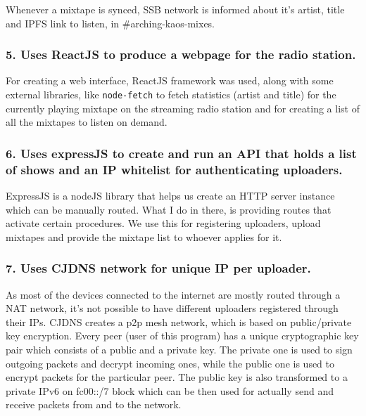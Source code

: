 \documentclass[12pt]{report}
\begin{document}
Whenever a mixtape is synced, SSB network is informed about it's artist,
title and IPFS link to listen, in \#arching-kaos-mixes.


\subsubsection{5. Uses ReactJS to produce a webpage for the radio
station.}\label{uses-reactjs-to-produce-a-webpage-for-the-radio-station.}

For creating a web interface, ReactJS framework was used, along with
some external libraries, like \texttt{node-fetch} to fetch statistics
(artist and title) for the currently playing mixtape on the streaming
radio station and for creating a list of all the mixtapes to listen on
demand.


\subsubsection{6. Uses expressJS to create and run an API that holds a list
of shows and an IP whitelist for authenticating
uploaders.}\label{uses-expressjs-to-create-and-run-an-api-that-holds-a-list-of-shows-and-an-ip-whitelist-for-authenticating-uploaders.}

ExpressJS is a nodeJS library that helps us create an HTTP server
instance which can be manually routed. What I do in there, is providing
routes that activate certain procedures. We use this for registering
uploaders, upload mixtapes and provide the mixtape list to whoever
applies for it.


\subsubsection{7. Uses CJDNS network for unique IP per
uploader.}\label{uses-cjdns-network-for-unique-ip-per-uploader.}

As most of the devices connected to the internet are mostly routed
through a NAT network, it's not possible to have different uploaders
registered through their IPs. CJDNS creates a p2p mesh network, which is
based on public/private key encryption. Every peer (user of this
program) has a unique cryptographic key pair which consists of a public
and a private key. The private one is used to sign outgoing packets and
decrypt incoming ones, while the public one is used to encrypt packets
for the particular peer. The public key is also transformed to a private
IPv6 on fc00::/7 block which can be then used for actually send and
receive packets from and to the network.
\end{document}

